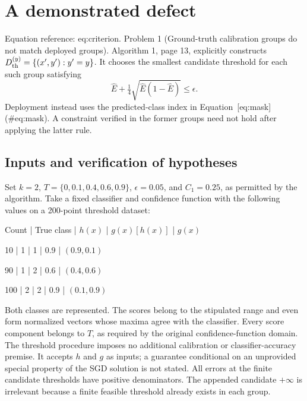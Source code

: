 \documentclass[10pt]{article}
\begin{document}
\section*{A demonstrated defect}
Equation reference: eq:criterion. Problem 1 (Ground-truth calibration groups do not match deployed groups).  Algorithm 1, page 13, explicitly constructs \(D_{\rm th}^{(y)}=\{(x',y'):y'=y\}\). It chooses the smallest candidate threshold for each such group satisfying \[
 \widehat E+\tfrac14\sqrt{\widehat E(1-\widehat E)}
 \leq\epsilon .\] Deployment instead uses the predicted-class index in Equation [eq:mask] (\#eq:mask). A constraint verified in the former groups need not hold after applying the latter rule.\par
\subsection*{Inputs and verification of hypotheses}
Set \(k=2\), \(T=\{0,0.1,0.4,0.6,0.9\}\), \(\epsilon=0.05\), and \(C_1=0.25\), as permitted by the algorithm. Take a fixed classifier and confidence function with the following values on a 200-point threshold dataset:\par
Count | True class | \(h(x)\) | \(g(x)[h(x)]\) | \(g(x)\)\par
10 | 1 | 1 | 0.9 | \((0.9,0.1)\)\par
90 | 1 | 2 | 0.6 | \((0.4,0.6)\)\par
100 | 2 | 2 | 0.9 | \((0.1,0.9)\)\par
Both classes are represented. The scores belong to the stipulated range and even form normalized vectors whose maxima agree with the classifier. Every score component belongs to \(T\), as required by the original confidence-function domain. The threshold procedure imposes no additional calibration or classifier-accuracy premise. It accepts \(h\) and \(g\) as inputs; a guarantee conditional on an unprovided special property of the SGD solution is not stated. All errors at the finite candidate thresholds have positive denominators. The appended candidate \(+\infty\) is irrelevant because a finite feasible threshold already exists in each group.\par
\end{document}
